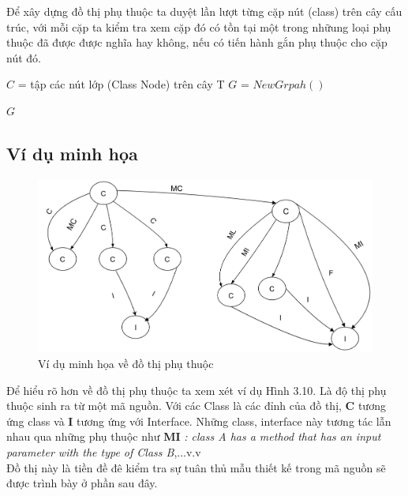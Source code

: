 \documentclass[12pt]{report}
\newenvironment{thuattoan}[1][h]
  {\renewcommand{\algorithmcfname}{Thuật toán}
   \begin{algorithm}[#1]
  }{\end{algorithm}}
\begin{document}
\newpage
\noindent Để xây dựng đồ thị phụ thuộc ta duyệt lần lượt từng cặp nút (class) trên cây cấu trúc, với mỗi cặp ta kiểm tra xem cặp đó có tồn tại một trong nhữung loại phụ thuộc đã được được nghĩa hay không, nếu có tiến hành gắn phụ thuộc cho cặp nút đó.
\begin{thuattoan}
		\label{algo:dependency-analyze}
		\caption{$JavaDependencyAnalyze(Root)$}
		$C$ = tập các nút lớp (Class Node) trên cây T \;
		$G$ = $New Grpah()$\;
	
		\Return $G$\;
\end{thuattoan}

\newpage
\subsection{Ví dụ minh họa}
\begin{figure}[!htbp]
	\centering
	\includegraphics[scale=0.25]{images/example_graph_dependency}
	\caption{Ví dụ minh họa về đồ thị phụ thuộc}
	\label{fig:example_graph_dependency}
\end{figure}
\noindent Để hiểu rõ hơn về đồ thị phụ thuộc ta xem xét ví dụ Hình 3.10. Là độ thị phụ thuộc sinh ra từ một mã nguồn. Với các Class là các đỉnh của đồ thị, \textbf{C} tương ứng class và \textbf{I} tương ứng với Interface. Những class, interface này tương tác lẫn nhau qua những phụ thuộc như \textbf{MI} \textit{: class A has a method that has an input parameter with the type of Class B},...v.v\\
Đồ thị này là tiền đề đê kiểm tra sự tuân thủ mẫu thiết kế trong mã nguồn sẽ được trình bày ở phần sau đây.
\end{document}
